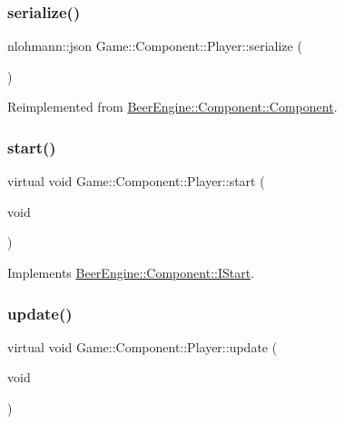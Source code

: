 \subsubsection{\texorpdfstring{serialize()}{serialize()}}
{\footnotesize\ttfamily nlohmann\+::json Game\+::\+Component\+::\+Player\+::serialize (\begin{DoxyParamCaption}{ }\end{DoxyParamCaption})\hspace{0.3cm}{\ttfamily [virtual]}}



Reimplemented from \mbox{\hyperlink{class_beer_engine_1_1_component_1_1_component_a4d82d8a6b22b93514e0585fa4073041f}{Beer\+Engine\+::\+Component\+::\+Component}}.

\mbox{\label{class_game_1_1_component_1_1_player_a317e5d073713ea27ceffe5de642240a6}} 
\subsubsection{\texorpdfstring{start()}{start()}}
{\footnotesize\ttfamily virtual void Game\+::\+Component\+::\+Player\+::start (\begin{DoxyParamCaption}\item[{void}]{ }\end{DoxyParamCaption})\hspace{0.3cm}{\ttfamily [virtual]}}



Implements \mbox{\hyperlink{class_beer_engine_1_1_component_1_1_i_start_aa3e25e86e20c46cdaefc6f6d7f21e495}{Beer\+Engine\+::\+Component\+::\+I\+Start}}.

\mbox{\label{class_game_1_1_component_1_1_player_a52212c267395699de71b77e88b93032d}} 
\subsubsection{\texorpdfstring{update()}{update()}}
{\footnotesize\ttfamily virtual void Game\+::\+Component\+::\+Player\+::update (\begin{DoxyParamCaption}\item[{void}]{ }\end{DoxyParamCaption})\hspace{0.3cm}{\ttfamily [virtual]}}



